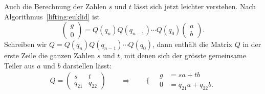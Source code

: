 Auch die Berechnung der Zahlen $s$ und $t$ lässt sich jetzt leichter verstehen.
Nach Algorithmus~\ref{lifting:euklid} ist
\[
\begin{pmatrix} g \\ 0 \end{pmatrix}
=
Q(q_n)Q(q_{n-1})\cdots Q(q_0)
\begin{pmatrix} a \\ b \end{pmatrix}.
\]
Schreiben wir $Q=Q(q_n)Q(q_{n-1})\cdots Q(q_0)$, dann enthält die Matrix
$Q$ in der erste Zeile die ganzen Zahlen $s$ und $t$, mit denen sich der
grösste gemeinsame Teiler aus $a$ und $b$ darstellen lässt:
\[
Q =
\begin{pmatrix}
s&t\\
q_{21}&q_{22}
\end{pmatrix}
\qquad\Rightarrow\qquad
\bigg\{
\quad
\begin{aligned}
g&=sa+tb\\
0&=q_{21}a+q_{22}b.
\end{aligned}
\]

